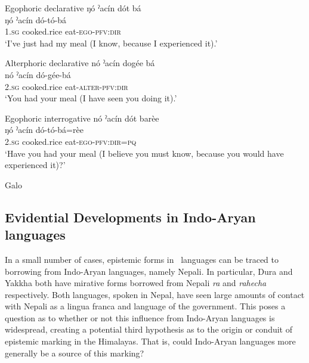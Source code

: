 \begin{exe}
    \ex\label{e:History:Galo}
    \begin{xlist}
    \ex Egophoric declarative
    \glll ŋó ˀacín dót bá \\
    ŋó ˀacín dó-tó-bá \\
    1.\textsc{sg} cooked.rice eat-\textsc{ego-pfv:dir} \\
    \glt `I've just had my meal (I know, because I experienced it).'

    \ex Alterphoric declarative
    \glll nó ˀacín dogée bá \\
    nó ˀacín dó-gée-bá \\
    2.\textsc{sg} cooked.rice eat-\textsc{alter-pfv:dir} \\
    \glt `You had your meal (I have seen you doing it).'

    \ex Egophoric interrogative
    \glll nó ˀacín dót barèe \\
    ŋó ˀacín dó-tó-bá=rèe \\
    2.\textsc{sg} cooked.rice eat-\textsc{ego-pfv:dir=pq} \\
    \glt `Have you had your meal (I believe you must know, because you would have experienced it)?'
    \end{xlist}
    Galo \cite[Tani: India,][114]{Post2013}
\end{exe}


\subsection{Evidential Developments in Indo-Aryan languages}
In a small number of cases, epistemic forms in \lfam\ languages can be traced to borrowing from Indo-Aryan languages, namely Nepali. In particular, Dura \cite[Internal Isolate: Nepal,][279]{Schorer2016} and Yakkha \cite[Kiranti: Nepal,][520]{Schackow2015} both have mirative forms borrowed from Nepali \textit{ra} and \textit{rahecha} respectively. Both languages, spoken in Nepal, have seen large amounts of contact with Nepali as a lingua franca and language of the government. This poses a question as to whether or not this influence from Indo-Aryan languages is widespread, creating a potential third hypothesis as to the origin or conduit of epistemic marking in the Himalayas. That is, could Indo-Aryan languages more generally be a source of this marking?

